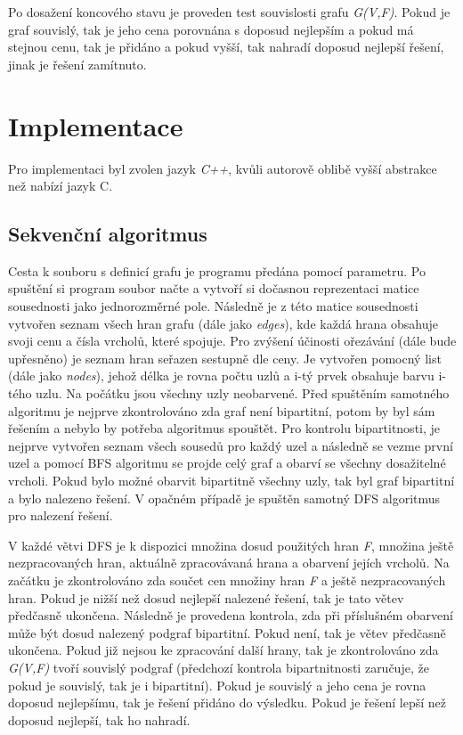 \documentclass{article}%
\begin{document}
Po dosažení koncového stavu je proveden test souvislosti grafu \textit{G(V,F)}. Pokud je graf souvislý, tak je jeho cena porovnána s doposud nejlepším a pokud má stejnou cenu, tak je přidáno a pokud vyšší, tak nahradí doposud nejlepší řešení, jinak je řešení zamítnuto.


\section{Implementace}
Pro implementaci byl zvolen jazyk \textit{C++}, kvůli autorově oblibě vyšší abstrakce než nabízí jazyk C.

\subsection{Sekvenční algoritmus}
Cesta k souboru s definicí grafu je programu předána pomocí parametru. Po spuštění si program soubor načte a vytvoří si dočasnou reprezentaci matice sousednosti jako jednorozměrné pole. Následně je z této matice sousednosti vytvořen seznam všech hran grafu (dále jako \textit{edges}), kde každá hrana obsahuje svoji cenu a čísla vrcholů, které spojuje. Pro zvýšení účinosti ořezávání (dále bude upřesněno) je seznam hran seřazen sestupně dle ceny. Je vytvořen pomocný list (dále jako \textit{nodes}), jehož délka je rovna počtu uzlů a i-tý prvek obsahuje barvu i-tého uzlu. Na počátku jsou všechny uzly neobarvené. Před spuštěním samotného algoritmu je nejprve zkontrolováno zda graf není bipartitní, potom by byl sám řešením a nebylo by potřeba algoritmus spouštět. Pro kontrolu bipartitnosti, je nejprve vytvořen seznam všech sousedů pro každý uzel a následně se vezme první uzel a pomocí BFS algoritmu se projde celý graf a obarví se všechny dosažitelné vrcholi. Pokud bylo možné obarvit bipartitně všechny uzly, tak byl graf bipartitní a bylo nalezeno řešení. V opačném případě je spuštěn samotný DFS algoritmus pro nalezení řešení.

V každé větvi DFS je k dispozici množina dosud použitých hran \textit{F}, množina ještě nezpracovaných hran, aktuálně zpracovávaná hrana a obarvení jejích vrcholů. Na začátku je zkontrolováno zda součet cen množiny hran \textit{F} a ještě nezpracovaných hran. Pokud je nižší než dosud nejlepší nalezené řešení, tak je tato větev předčasně ukončena. Následně je provedena kontrola, zda při příslušném obarvení může být dosud nalezený podgraf bipartitní. Pokud není, tak je větev předčasně ukončena. Pokud již nejsou ke zpracování další hrany, tak je zkontrolováno zda \textit{G(V,F)} tvoří souvislý podgraf (předchozí kontrola bipartnitnosti zaručuje, že pokud je souvislý, tak je i bipartitní). Pokud je souvislý a jeho cena je rovna doposud nejlepšímu, tak je řešení přidáno do výsledku. Pokud je řešení lepší než doposud nejlepší, tak ho nahradí.
\end{document}
